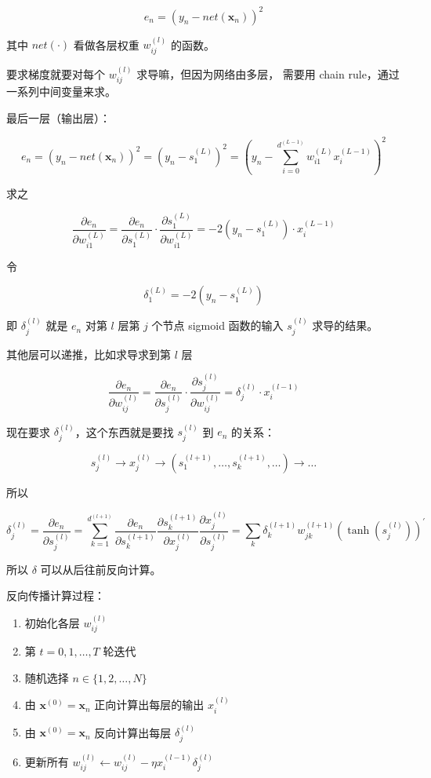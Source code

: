 \documentclass[a4paper]{article}
\begin{document}
$$e_n = (y_n - net(\mathbf{x}_n))^2$$

其中 $net(\cdot)$ 看做各层权重 $w_{ij}^{(l)}$ 的函数。

要求梯度就要对每个 $w_{ij}^{(l)}$ 求导嘛，但因为网络由多层，
需要用 chain rule，通过一系列中间变量来求。

最后一层（输出层）：

$$e_n = (y_n - net(\mathbf{x}_n))^2 = (y_n - s_1^{(L)})^2 = \left ( y_n - \sum_{i=0}^{d^{(L-1)}} w_{i1}^{(L)}x_i^{(L-1)} \right )^2$$

求之

$$\frac{\partial e_n}{\partial w_{i1}^{(L)}} = \frac{\partial e_n}{\partial s_1^{(L)}} \cdot \frac{\partial s_1^{(L)}}{\partial w_{i1}^{(L)}} = -2(y_n - s_1^{(L)}) \cdot x_i^{(L-1)}$$

令

$$\delta_1^{(L)} = -2(y_n - s_1^{(L)})$$

即 $\delta_j^{(l)}$ 就是 $e_n$ 对第 $l$ 层第 $j$ 个节点 sigmoid 函数的输入 $s_j^{(l)}$ 求导的结果。

其他层可以递推，比如求导求到第 $l$ 层

$$\frac{\partial e_n}{\partial w_{ij}^{(l)}} = \frac{\partial e_n}{\partial s_j^{(l)}} \cdot \frac{\partial s_j^{(l)}}{\partial w_{ij}^{(l)}} = \delta_j^{(l)} \cdot x_i^{(l-1)}$$

现在要求 $\delta_j^{(l)}$，这个东西就是要找 $s_j^{(l)}$ 到 $e_n$ 的关系：


$$s_j^{(l)} \rightarrow x_j^{(l)} \rightarrow (s_1^{(l+1)}, \dots, s_k^{(l+1)}, \dots) \rightarrow \dots$$

所以

$$\delta_j^{(l)} = \frac{\partial e_n}{\partial s_j^{(l)}}
                 = \sum_{k=1}^{d^{(l+1)}} \frac{\partial e_n}{\partial s_k^{(l+1)}}
                                          \frac{\partial s_k^{(l+1)}}{\partial x_j^{(l)}}
                                          \frac{\partial x_j^{(l)}}{\partial s_j^{(l)}}
                 = \sum_{k} \delta_k^{(l+1)} w_{jk}^{(l+1)} (\tanh(s_j^{(l)}))^{\prime}$$

所以 $\delta$ 可以从后往前反向计算。

反向传播计算过程：
\begin{enumerate}
  \item 初始化各层 $w_{ij}^{(l)}$ \\
  \item 第 $t = 0, 1, \dots, T$ 轮迭代 \\
  \item 随机选择 $n \in \{1, 2, \dots, N\}$ \\
  \item 由 $\mathbf{x}^{(0)} = \mathbf{x}_n$ 正向计算出每层的输出 $x_i^{(l)}$ \\
  \item 由 $\mathbf{x}^{(0)} = \mathbf{x}_n$ 反向计算出每层 $\delta_j^{(l)}$ \\
  \item 更新所有 $w_{ij}^{(l)} \leftarrow w_{ij}^{(l)} - \eta x_i^{(l-1)} \delta_j^{(l)}$ \\
\end{enumerate}
\end{document}
